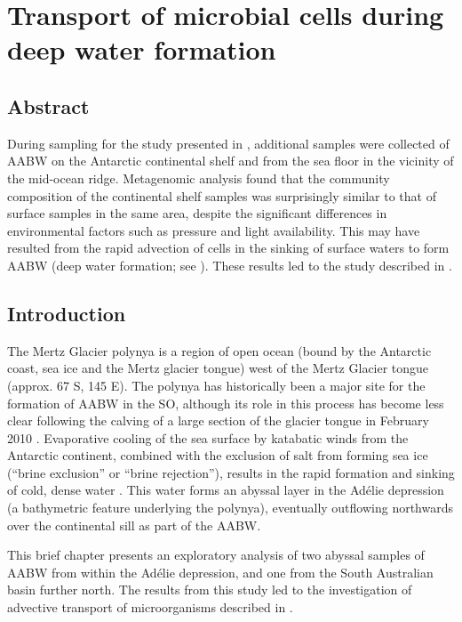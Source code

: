 \chapter[Deep water formation]{Transport of microbial cells during deep water formation}
\label{ch:deepwaterformation}

\section{Abstract}

During sampling for the study presented in , additional samples were collected of \ac{AABW} on the Antarctic continental shelf and from the sea floor in the vicinity of the mid-ocean ridge.
Metagenomic analysis found that the community composition of the continental shelf samples was surprisingly similar to that of surface samples in the same area, despite the significant differences in environmental factors such as pressure and light availability.
This may have resulted from the rapid advection of cells in the sinking of surface waters to form \ac{AABW} (deep water formation; see ).
These results led to the study described in .

\section{Introduction}

The Mertz Glacier polynya is a region of open ocean (bound by the Antarctic coast, sea ice and the Mertz glacier tongue) west of the Mertz Glacier tongue (approx. 67\textdegree{} S, 145\textdegree{} E).
The polynya has historically been a major site for the formation of \ac{AABW} in the \ac{SO}, although its role in this process has become less clear following the calving of a large section of the glacier tongue in February 2010 \cite{Tamura:2012da}.
Evaporative cooling of the sea surface by katabatic winds from the Antarctic continent, combined with the exclusion of salt from forming sea ice (``brine exclusion'' or ``brine rejection''), results in the rapid formation and sinking of cold, dense water \cite{Williams:2008iu}.
This water forms an abyssal layer in the Ad\'{e}lie depression (a bathymetric feature underlying the polynya), eventually outflowing northwards over the continental sill as part of the \ac{AABW}.

This brief chapter presents an exploratory analysis of two abyssal samples of \ac{AABW} from within the Ad\'{e}lie depression, and one from the South Australian basin further north.
The results from this study led to the investigation of advective transport of microorganisms described in .

